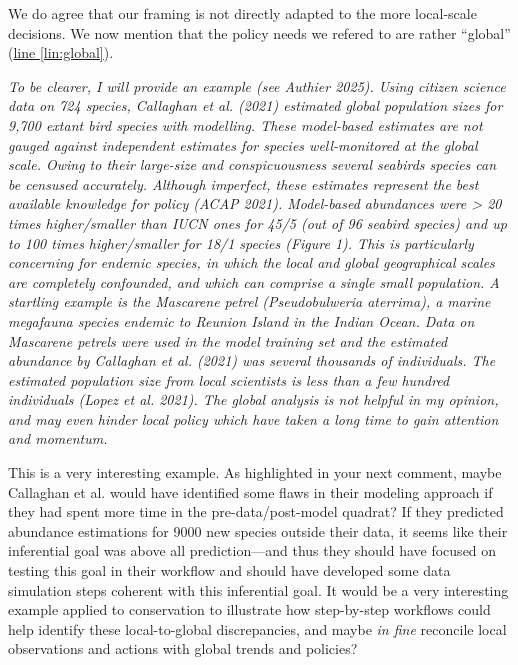 \documentclass[11pt,letter]{article}
\begin{document}
We do agree that our framing is not directly adapted to the more local-scale decisions. We now mention that the policy needs we refered to are rather ``global'' (\href{file:forecastflows_r2\#lintarget:global}{line \ref*{lin:global}}).

\begin{mybox}
\emph{To be clearer, I will provide an example (see Authier 2025). Using citizen science data on 724
species, Callaghan et al. (2021) estimated global population sizes for 9,700 extant bird species
with modelling. These model-based estimates are not gauged against independent estimates
for species well-monitored at the global scale. Owing to their large-size and conspicuousness
several seabirds species can be censused accurately. Although imperfect, these estimates
represent the best available knowledge for policy (ACAP 2021). Model-based abundances
were > 20 times higher/smaller than IUCN ones for 45/5 (out of 96 seabird species) and up to
100 times higher/smaller for 18/1 species (Figure 1). This is particularly concerning for
endemic species, in which the local and global geographical scales are completely confounded,
and which can comprise a single small population. A startling example is the Mascarene petrel
(Pseudobulweria aterrima), a marine megafauna species endemic to Reunion Island in the Indian
Ocean. Data on Mascarene petrels were used in the model training set and the estimated
abundance by Callaghan et al. (2021) was several thousands of individuals. The estimated
population size from local scientists is less than a few hundred individuals (Lopez et al. 2021).
The global analysis is not helpful in my opinion, and may even hinder local policy which have
taken a long time to gain attention and momentum.} 
\end{mybox}

This is a very interesting example. As highlighted in your next comment, maybe Callaghan et al. would have identified some flaws in their modeling approach if they had spent more time in the pre-data/post-model quadrat? If they predicted abundance estimations for 9000 new species outside their data, it seems like their inferential goal was above all prediction---and thus they should have focused on testing this goal in their workflow and should have developed some data simulation steps coherent with this inferential goal. It would be a very interesting example applied to conservation to illustrate how step-by-step workflows could help identify these local-to-global discrepancies, and maybe \emph{in fine} reconcile local observations and actions with global trends and policies?
\end{document}
